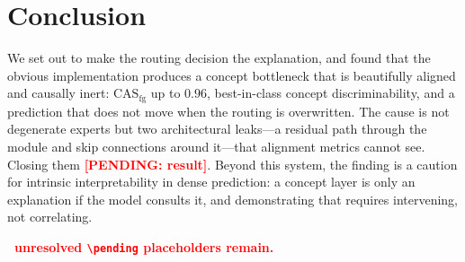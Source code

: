 \documentclass[runningheads]{llncs}
\newcommand{\casfg}{\mathrm{CAS}_{\mathrm{fg}}}
\newcounter{pend}
\newcommand{\pending}[1]{\stepcounter{pend}\textcolor{red}{\textbf{[PENDING: #1]}}}
\newcommand{\pendingcount}{\textcolor{red}{\textbf{%
  \thepend\ unresolved \texttt{\textbackslash pending} placeholders remain.}}}
\begin{document}
\section{Conclusion}
We set out to make the routing decision the explanation, and found that the obvious
implementation produces a concept bottleneck that is beautifully aligned and causally inert:
$\casfg$ up to $0.96$, best-in-class concept discriminability, and a prediction that does not
move when the routing is overwritten. The cause is not degenerate experts but two architectural
leaks---a residual path through the module and skip connections around it---that alignment
metrics cannot see. Closing them \pending{result}. Beyond this system, the finding is a caution
for intrinsic interpretability in dense prediction: a concept layer is only an explanation if
the model consults it, and demonstrating that requires intervening, not correlating.

\medskip\noindent\pendingcount



\end{document}

